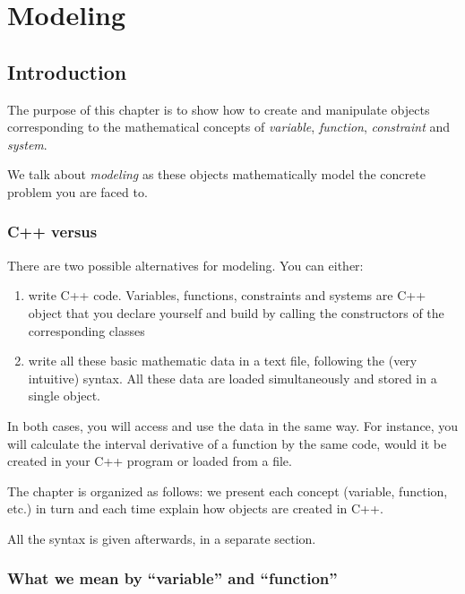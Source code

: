 \chapter{Modeling}\label{chap:mod}


\section{Introduction}

The purpose of this chapter is to show how to create and manipulate
objects corresponding to the mathematical concepts of
{\it variable}, {\it function}, {\it constraint} and {\it system}.

We talk about {\it modeling} as these objects mathematically model the concrete problem you are faced to.

\subsection{C++ versus \quimper}

There are two possible alternatives for modeling.
You can either:
\begin{enumerate}
\item write C++ code. Variables, functions, constraints
and systems are C++ object that you declare yourself
and build by calling the constructors of the corresponding classes
\item write all these basic mathematic data in a text file, following
the (very intuitive) \quimper syntax. All these data are loaded
simultaneously and stored in a single  object.
\end{enumerate}

In both cases, you will access and use the data in the same way.
For instance, you will calculate the interval derivative of a function
by the same code, would it be created in your C++ program or loaded
from a \quimper file.

The chapter is organized as follows: we present
each concept (variable, function, etc.) in turn and
each time explain how objects are created in C++.

All the \quimper syntax is given afterwards, in a separate section.
 
\subsection{What we mean by ``variable'' and ``function''}

